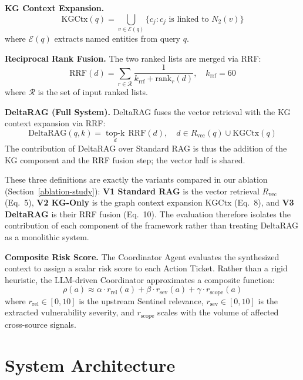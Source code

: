 \documentclass[
]{article}
\begin{document}
\noindent\textbf{KG Context Expansion.}
\begin{equation}
  \mathrm{KGCtx}(q) =
    \bigcup_{v \in \mathcal{E}(q)} \bigl\{c_j : c_j \text{ is linked to } N_2(v)\bigr\}
\end{equation}
where $\mathcal{E}(q)$ extracts named entities from query $q$.

\noindent\textbf{Reciprocal Rank Fusion.} The two ranked lists are merged via RRF:
\begin{equation}
  \mathrm{RRF}(d) = \sum_{r \in \mathcal{R}} \frac{1}{k_{\mathrm{rrf}} + \mathrm{rank}_r(d)}, \quad k_{\mathrm{rrf}} = 60
\end{equation}
where $\mathcal{R}$ is the set of input ranked lists.

\noindent\textbf{DeltaRAG (Full System).} DeltaRAG fuses the vector retrieval with the KG context expansion via RRF:
\begin{equation}
  \mathrm{DeltaRAG}(q,k) =
    \operatorname*{top\text{-}k}_{d}\,\mathrm{RRF}(d),
    \quad d \in R_{\mathrm{vec}}(q) \cup \mathrm{KGCtx}(q)
\end{equation}
The contribution of DeltaRAG over Standard RAG is thus the addition of the KG component and the RRF fusion step; the vector half is shared.

\noindent These three definitions are exactly the variants compared in our ablation (Section~\ref{ablation-study}): \textbf{V1 Standard RAG} is the vector retrieval $R_{\mathrm{vec}}$ (Eq.~5), \textbf{V2 KG-Only} is the graph context expansion $\mathrm{KGCtx}$ (Eq.~8), and \textbf{V3 DeltaRAG} is their RRF fusion (Eq.~10). The evaluation therefore isolates the contribution of each component of the framework rather than treating DeltaRAG as a monolithic system.

\noindent\textbf{Composite Risk Score.} The Coordinator Agent evaluates the synthesized context to assign a scalar risk score to each Action Ticket. Rather than a rigid heuristic, the LLM-driven Coordinator approximates a composite function:
\begin{equation}
  \rho(a) \approx \alpha \cdot r_{\mathrm{rel}}(a) + \beta \cdot r_{\mathrm{sev}}(a) + \gamma \cdot r_{\mathrm{scope}}(a)
\end{equation}
where $r_{\mathrm{rel}} \in [0,10]$ is the upstream Sentinel relevance, $r_{\mathrm{sev}} \in [0,10]$ is the extracted vulnerability severity, and $r_{\mathrm{scope}}$ scales with the volume of affected cross-source signals.

\section{System Architecture}\label{system-architecture}
\end{document}
